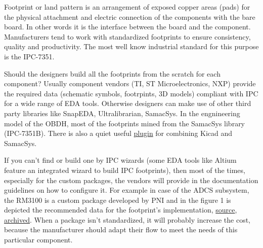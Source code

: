 \documentclass[12pt]{article}
\begin{document}

Footprint or land pattern is an arrangement of exposed copper areas (pads) for the physical attachment and electric connection of the components with the bare board. In other words it is the interface between the board and the component. Manufacturers tend to work with standardized footprints to ensure consistency, quality and productivity. The most well know industrial standard for this purpose is the IPC-7351. 

Should the designers build all the footprints from the scratch for each component? Usually component vendors (TI, ST Microelectronics, NXP) provide the required data (schematic symbols, footrpints, 3D models) compliant with IPC for a wide range of EDA tools. Otherwise designers can make use of other third party libraries like SnapEDA, Ultralibrarian, SamacSys. In the engnineering model of the OBDH, most of the footprints mined from the SamacSys library (IPC-7351B). There is also a quiet useful \href{https://www.samacsys.com/kicad-libraries/}{plugin} for combining Kicad and SamacSys.

If you can't find or build one by IPC wizards (some EDA tools like Altium feature an integrated wizard to build IPC footprints), then most of the times, especially for the custom packages, the vendors will provide in the documentation guidelines on how to configure it. For example in case of the ADCS subsystem, the RM3100 is a custom package developed by PNI and in the figure 1 is depicted the recommended data for the footprint's implementation, \href{https://www.pnicorp.com/wp-content/uploads/RM3100-Sensor-Suite-User-Manual-R07-1-2.pdf}{source}, \href{https://web.archive.org/web/20200812135747/https://www.pnicorp.com/wp-content/uploads/RM3100-Sensor-Suite-User-Manual-R07-1-2.pdf}{archived}. When a package isn't standardized, it will probably increase the cost, because the manufacturer should adapt their flow to meet the needs of this particular component. %
\end{document}
